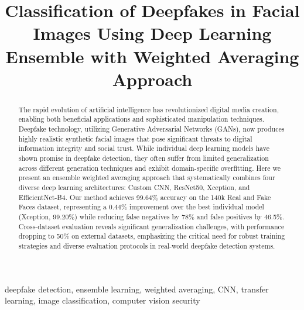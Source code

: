 \documentclass[conference]{IEEEtran}
\begin{document}
\title{Classification of Deepfakes in Facial Images Using Deep Learning Ensemble with Weighted Averaging Approach}


\maketitle

\begin{abstract}
The rapid evolution of artificial intelligence has revolutionized digital media creation, enabling both beneficial applications and sophisticated manipulation techniques. Deepfake technology, utilizing Generative Adversarial Networks (GANs), now produces highly realistic synthetic facial images that pose significant threats to digital information integrity and social trust. While individual deep learning models have shown promise in deepfake detection, they often suffer from limited generalization across different generation techniques and exhibit domain-specific overfitting. Here we present an ensemble weighted averaging approach that systematically combines four diverse deep learning architectures: Custom CNN, ResNet50, Xception, and EfficientNet-B4. Our method achieves 99.64\% accuracy on the 140k Real and Fake Faces dataset, representing a 0.44\% improvement over the best individual model (Xception, 99.20\%) while reducing false negatives by 78\% and false positives by 46.5\%. Cross-dataset evaluation reveals significant generalization challenges, with performance dropping to 50\% on external datasets, emphasizing the critical need for robust training strategies and diverse evaluation protocols in real-world deepfake detection systems.
\end{abstract}

\begin{IEEEkeywords}
deepfake detection, ensemble learning, weighted averaging, CNN, transfer learning, image classification, computer vision security
\end{IEEEkeywords}
\end{document}

